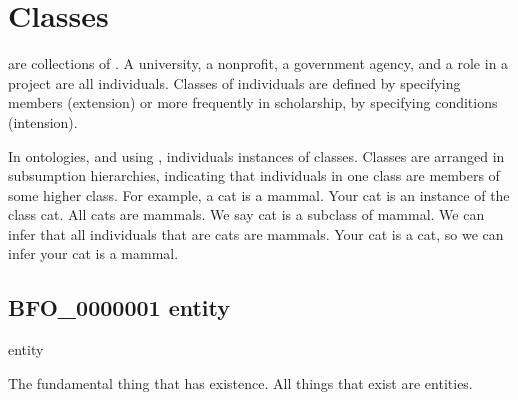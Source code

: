 \documentclass[letterpaper,10pt,english]{sphinxmanual}
\begin{document}
\sphinxAtStartPar
{}


\chapter{Classes}
\label{\detokenize{classes:classes}}\label{\detokenize{classes::doc}}
\sphinxAtStartPar
{} are collections of .  A university, a non\sphinxhyphen{}profit, a
government agency, and a role in a project are
all individuals.  Classes of individuals are defined by specifying members
(extension) or more frequently
in scholarship, by specifying conditions (intension).

\sphinxAtStartPar
In ontologies, and using {\hyperref[\detokenize{glossary:glossary}]{}}, individuals
instances of classes. Classes are arranged
in subsumption hierarchies, indicating that individuals in one class are members of some
higher class.  For example, a cat is a mammal.  Your cat is an instance of the
class cat.  All cats are mammals.  We say cat is a subclass of mammal.  We can infer
that all individuals that are
cats are mammals.  Your cat is a cat, so we can infer your cat is a mammal.
\begin{quote}
\label{\detokenize{doc-BFO_0000001:bfo-0000001}}\label{\detokenize{doc-BFO_0000001:entity}}\label{\detokenize{doc-BFO_0000001:bfo-0000001}}
\ignorespaces \end{quote}


\section{BFO\_0000001 \sphinxhyphen{} entity}
\label{\detokenize{doc-BFO_0000001:bfo-0000001-entity}}\label{\detokenize{doc-BFO_0000001:index-0}}\label{\detokenize{doc-BFO_0000001::doc}}
\begin{sphinxShadowBox}

\sphinxAtStartPar
entity
\end{sphinxShadowBox}

\begin{sphinxShadowBox}

\sphinxAtStartPar
The fundamental thing that has existence. All things that exist are entities.
\end{sphinxShadowBox}
\end{document}
